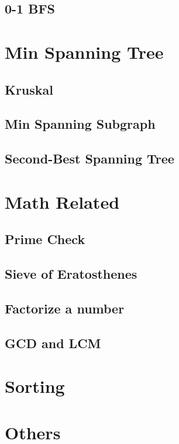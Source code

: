 	\subsection{0-1 BFS}

\section{Min Spanning Tree}
	\subsection{Kruskal}
	\subsection{Min Spanning Subgraph}
	\subsection{Second-Best Spanning Tree}
		

\section{Math Related}
	\subsection{Prime Check}
	\subsection{Sieve of Eratosthenes}
	\subsection{Factorize a number}
	\subsection{GCD and LCM}

\section{Sorting}
	
\section{Others}
